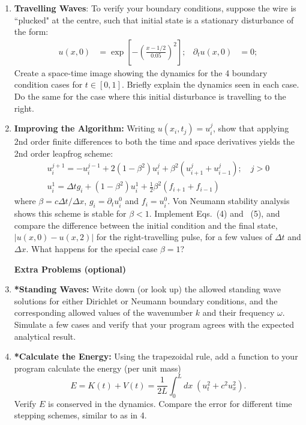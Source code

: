 \documentclass[11pt]{article}
\begin{document}
\begin{enumerate}
\item \textbf{Travelling Waves}: To verify your boundary conditions, suppose the wire is ``plucked" at the centre, such that initial state is a stationary disturbance of the form:
\begin{align}
u(x,0) &= \exp{\left[- \left(\frac{x-1/2 }{0.05} \right)^2 \right]};&  \partial_t u(x,0) &= 0;
\end{align}
Create a space-time image showing the dynamics for the 4 boundary condition cases for $t \in [0,1]$. Briefly explain the dynamics seen in each case. Do the same for the case where this initial disturbance  is  travelling to the right.

\item \textbf{Improving the Algorithm:}  Writing $u(x_i,t_j) = u_i^j$, show that applying 2nd order finite differences to both the time and space derivatives yields the 2nd order leapfrog scheme:
\begin{gather}
u_i^{j+1} = -u_i^{j-1} + 2(1- \beta^2)  u_i^j + \beta^2(u_{i+1}^j + u^j_{i-1});  \quad j>0  \\
u_i^{1} = \Delta t g_i + (1 - \beta^2) u_i^1 + \tfrac{1}{2}\beta^2 (f_{i+1} + f_{i-1})
\end{gather}
where $\beta = c \Delta t / \Delta x$, $g_i = \partial_t u_i^0$ and $f_i = u_i^0$.  Von Neumann stability analysis shows this scheme is stable for $\beta < 1$. Implement Eqs.~(4) and ~(5), and compare the difference between the initial condition and the final state,  $|u(x,0)-u(x,2)|$ for the right-travelling pulse, for a few values of $\Delta t$ and $\Delta x$.  What happens for the special case $\beta = 1$?
\newpage


\textbf{Extra Problems (optional)}

\item \textbf{*Standing Waves:} Write down (or look up) the allowed standing wave solutions for either Dirichlet or Neumann boundary conditions, and the corresponding allowed values of the wavenumber $k$ and their frequency $\omega$. Simulate a few cases and verify that your program agrees with the expected analytical result.

\item \textbf{*Calculate the Energy:} Using the trapezoidal rule, add a function to your program calculate the energy (per unit mass)
\begin{equation}
E = K(t) + V(t) = \frac{1}{2 L}  \int_0^L dx\;  \left( u_t^2 +  c^2 u_x^2 \right) .
\end{equation}
Verify $E$ is conserved in the dynamics. Compare the error for different time stepping schemes, similar to as in 4.


\end{enumerate}
\end{document}

